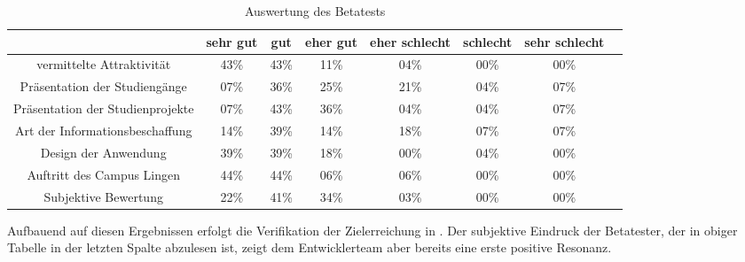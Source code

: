 \begin{table}[h]
\centering
\begin{tabular}{cccccccl}
\hline
\multicolumn{1}{l}{}              & sehr gut  & gut  & eher gut & eher schlecht & schlecht & sehr schlecht \\ \hline

vermittelte Attraktivität         & 43\%      & 43\% & 11\%     & 04\%           & 00\%    & 00\%          \\ \hline
Präsentation der Studiengänge     & 07\%      & 36\% & 25\%     & 21\%           & 04\%    & 07\%          \\ \hline
Präsentation der Studienprojekte  & 07\%      & 43\% & 36\%     & 04\%           & 04\%    & 07\%          \\ \hline
Art der Informationsbeschaffung   & 14\%      & 39\% & 14\%     & 18\%           & 07\%    & 07\%          \\ \hline
Design der Anwendung              & 39\%      & 39\% & 18\%     & 00\%           & 04\%    & 00\%          \\ \hline
Auftritt des Campus Lingen        & 44\%      & 44\% & 06\%     & 06\%           & 00\%    & 00\%          \\ \hline

Subjektive Bewertung              & 22\%      & 41\% & 34\%     & 03\%           & 00\%    & 00\%          \\ \hline
\end{tabular}
\caption{Auswertung des Betatests}%
\label{tab:Fragebogen}%
\end{table}

Aufbauend auf diesen Ergebnissen erfolgt die Verifikation der Zielerreichung in .
Der subjektive Eindruck der Betatester, der in obiger Tabelle in der letzten Spalte abzulesen ist,
zeigt dem Entwicklerteam aber bereits eine erste positive Resonanz.